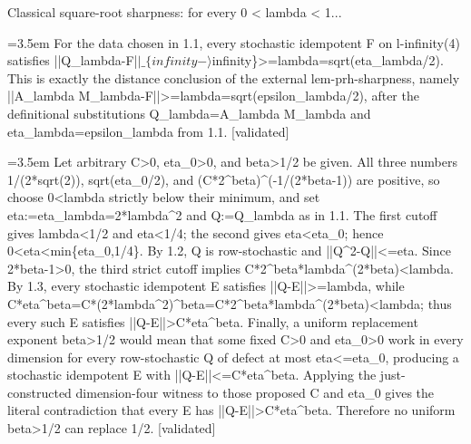 \documentclass{article}
\newcommand{\step}[1]{\par\noindent\hangindent=3.5em\hangafter=1%
  \makebox[3.5em][l]{\textbf{#1.}}}
\newcommand{\steptag}[1]{\hfill{\small\textsf{[#1]}}}
\begin{document}
\begin{proofbox}{Classical square-root sharpness: for every 0 < lambda < 1...}
\step{1.3} For the data chosen in 1.1, every stochastic idempotent F on l-infinity(4) satisfies ||Q\_lambda-F|$|\_\{infinity-\rangle$infinity\}>=lambda=sqrt(eta\_lambda/2). This is exactly the distance conclusion of the external lem-prh-sharpness, namely ||A\_lambda M\_lambda-F||>=lambda=sqrt(epsilon\_lambda/2), after the definitional substitutions Q\_lambda=A\_lambda M\_lambda and eta\_lambda=epsilon\_lambda from 1.1. \steptag{validated} \\[4pt]
\step{1.4} Let arbitrary C>0, eta\_0>0, and beta>1/2 be given. All three numbers 1/(2*sqrt(2)), sqrt(eta\_0/2), and (C*2\textasciicircum{}beta)\textasciicircum{}(-1/(2*beta-1)) are positive, so choose 0<lambda strictly below their minimum, and set eta:=eta\_lambda=2*lambda\textasciicircum{}2 and Q:=Q\_lambda as in 1.1. The first cutoff gives lambda<1/2 and eta<1/4; the second gives eta<eta\_0; hence 0<eta<min\{eta\_0,1/4\}. By 1.2, Q is row-stochastic and ||Q\textasciicircum{}2-Q||<=eta. Since 2*beta-1>0, the third strict cutoff implies C*2\textasciicircum{}beta*lambda\textasciicircum{}(2*beta)<lambda. By 1.3, every stochastic idempotent E satisfies ||Q-E||>=lambda, while C*eta\textasciicircum{}beta=C*(2*lambda\textasciicircum{}2)\textasciicircum{}beta=C*2\textasciicircum{}beta*lambda\textasciicircum{}(2*beta)<lambda; thus every such E satisfies ||Q-E||>C*eta\textasciicircum{}beta. Finally, a uniform replacement exponent beta>1/2 would mean that some fixed C>0 and eta\_0>0 work in every dimension for every row-stochastic Q of defect at most eta<=eta\_0, producing a stochastic idempotent E with ||Q-E||<=C*eta\textasciicircum{}beta. Applying the just-constructed dimension-four witness to those proposed C and eta\_0 gives the literal contradiction that every E has ||Q-E||>C*eta\textasciicircum{}beta. Therefore no uniform beta>1/2 can replace 1/2. \steptag{validated} \\[4pt]
\end{proofbox}
\end{document}
